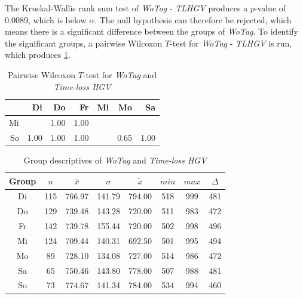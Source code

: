 The Kruskal-Wallis rank sum test of \textit{WoTag} - \textit{TLHGV} produces a $p$-value of 0.0089, which is below $\alpha$. The null hypothesis can therefore be rejected, which means there is a significant difference between the groups of \textit{WoTag}. To identify the significant groups, a pairwise Wilcoxon $T$-test for \textit{WoTag} - \textit{TLHGV} is run, which produces \cref{tbl:wilcoxon_baysis_effector_WoTag_TLHGV}. 
\begin{table}[ht!]
	\tiny
	\centering
    \begin{tabular}{rrrrrrr}
		\toprule
		   & Di & Do & Fr & Mi & Mo & Sa \\ 
		\midrule
		Mi & \red{0.03} & 1.00 & 1.00 &  &  &  \\ 
		So & 1.00 & 1.00 & 1.00 & \red{0.05} & 0.65 & 1.00 \\ 
		\bottomrule
	\end{tabular}
    \caption{Pairwise Wilcoxon $T$-test for \textit{WoTag} and \textit{Time-loss HGV}}
    \label{tbl:wilcoxon_baysis_effector_WoTag_TLHGV}
\end{table}
\begin{table}[ht!]
	\tiny
	\centering
    \begin{tabular}{c|c|c|c|c|c|c|c}
		\toprule
		Group & $n$ & $\bar{x}$ & $\sigma$ & $\tilde{x}$ & $min$ & $max$ & $\Delta$ \\
		\midrule
		Di & 115 & 766.97 & 141.79 & 794.00 & 518 & 999 & 481 \\ 
		Do & 129 & 739.48 & 143.28 & 720.00 & 511 & 983 & 472 \\ 
		Fr & 142 & 739.78 & 155.44 & 720.00 & 502 & 998 & 496 \\ 
		Mi & 124 & 709.44 & 140.31 & 692.50 & 501 & 995 & 494 \\ 
		Mo & 89  & 728.10 & 134.08 & 727.00 & 514 & 986 & 472 \\ 
		Sa & 65  & 750.46 & 143.80 & 778.00 & 507 & 988 & 481 \\ 
		So & 73  & 774.67 & 141.34 & 784.00 & 534 & 994 & 460 \\ 
		\bottomrule
	\end{tabular}
    \caption{Group descriptives of \textit{WoTag} and \textit{Time-loss HGV}}
    \label{tbl:descriptives_baysis_effector_WoTag_TLHGV}
\end{table}


